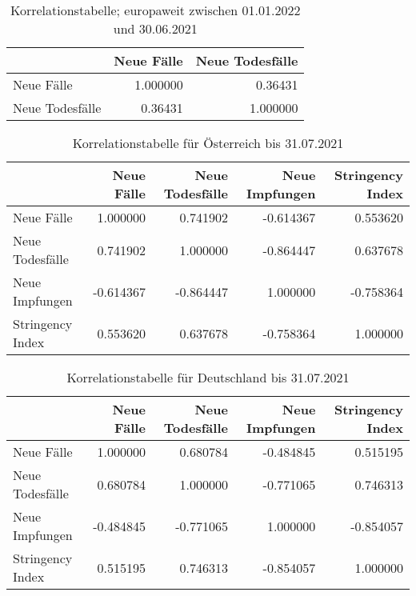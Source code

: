 \begin{table}[ht!]
    \centering
    \begin{tabular} {l | r r}
        & Neue Fälle & Neue Todesfälle \\
        \hline
        Neue Fälle & 1.000000 & 0.36431 \\
        Neue Todesfälle & 0.36431 & 1.000000 \\
    \end{tabular}
    \caption{Korrelationstabelle; europaweit zwischen 01.01.2022 und 30.06.2021}
    \label{tab:corr_wave3-2}
\end{table}

\begin{table}[ht!]
    \centering
    \begin{tabular} {l | r r r r}
        & Neue Fälle & Neue Todesfälle & Neue Impfungen & Stringency Index \\
        \hline
        Neue Fälle & 1.000000 & 0.741902 & -0.614367 & 0.553620 \\
        Neue Todesfälle & 0.741902 & 1.000000 & -0.864447 & 0.637678 \\
        Neue Impfungen & -0.614367 & -0.864447 & 1.000000 & -0.758364 \\
        Stringency Index & 0.553620 & 0.637678 & -0.758364 & 1.000000 \\
    \end{tabular}
    \caption{Korrelationstabelle für Österreich bis 31.07.2021}
    \label{tab:corr_aut}
\end{table}

\begin{table}[ht!]
    \centering
    \begin{tabular} {l | r r r r}
        & Neue Fälle & Neue Todesfälle & Neue Impfungen & Stringency Index \\
        \hline
        Neue Fälle & 1.000000 & 0.680784 & -0.484845 & 0.515195 \\
        Neue Todesfälle & 0.680784 & 1.000000 & -0.771065 & 0.746313 \\
        Neue Impfungen & -0.484845 & -0.771065 & 1.000000 & -0.854057 \\
        Stringency Index & 0.515195 & 0.746313 & -0.854057 & 1.000000 \\
    \end{tabular}
    \caption{Korrelationstabelle für Deutschland bis 31.07.2021}
    \label{tab:corr_deu}
\end{table}


